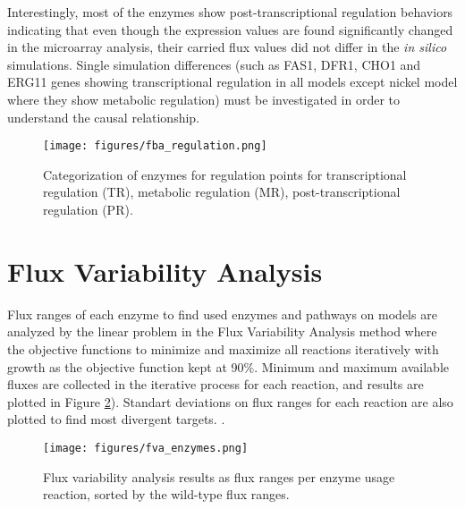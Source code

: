 Interestingly, most of the enzymes show post-transcriptional regulation behaviors indicating that even though the expression values are found significantly changed in the microarray analysis, their carried flux values did not differ in the \emph{in silico} simulations. Single simulation differences (such as FAS1, DFR1, CHO1 and ERG11 genes showing transcriptional regulation in all models except nickel model where they show metabolic regulation) must be investigated in order to understand the causal relationship.

\begin{figure}[H]
  \begin{center}
  \texttt{[image: figures/fba\_regulation.png]}
  \caption[Categorization of enzymes for regulation points for transcriptional regulation (TR), metabolic regulation (MR), post-transcriptional regulation (PR)]{Categorization of enzymes for regulation points for transcriptional regulation (TR), metabolic regulation (MR), post-transcriptional regulation (PR).}
  \label{fig:fba_regulation}
  \end{center}
\end{figure}

\section{Flux Variability Analysis}
Flux ranges of each enzyme to find used enzymes and pathways on models are analyzed by the linear problem in the Flux Variability Analysis method where the objective functions to minimize and maximize all reactions iteratively with growth as the objective function kept at 90\%. Minimum and maximum available fluxes are collected in the iterative process for each reaction, and results are plotted in Figure \ref{fig:fva_enzymes}). Standart deviations on flux ranges for each reaction are also plotted to find most divergent targets. .

\begin{figure}[H]
  \begin{center}
  \texttt{[image: figures/fva\_enzymes.png]}
  \caption[Flux variability analysis results as flux ranges per enzyme usage reaction, sorted by the wild-type flux ranges]{Flux variability analysis results as flux ranges per enzyme usage reaction, sorted by the wild-type flux ranges.}
  \end{center}
  \label{fig:fva_enzymes}
  \end{figure}

